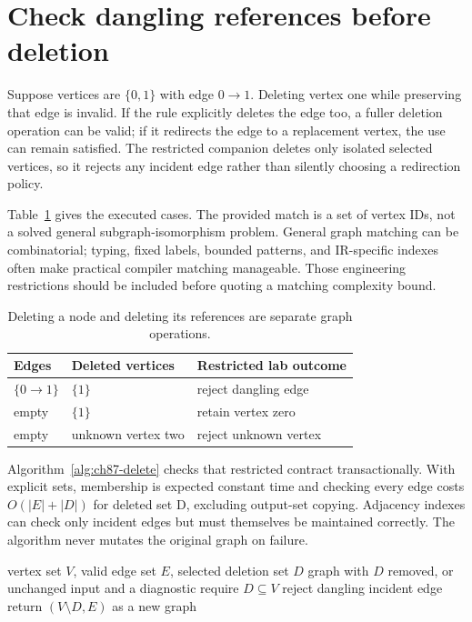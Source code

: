 \section{Check dangling references before deletion}
\label{sec:ch87-dangling}
Suppose vertices are $\{0,1\}$ with edge $0\to1$.
Deleting vertex one while preserving that edge is invalid.
If the rule explicitly deletes the edge too, a fuller deletion operation can be valid; if it redirects the edge to a replacement vertex, the use can remain satisfied.
The restricted companion deletes only isolated selected vertices, so it rejects any incident edge rather than silently choosing a redirection policy.

Table~\ref{tab:ch87-dangling} gives the executed cases.
The provided match is a set of vertex IDs, not a solved general subgraph-isomorphism problem.
General graph matching can be combinatorial; typing, fixed labels, bounded patterns, and IR-specific indexes often make practical compiler matching manageable.
Those engineering restrictions should be included before quoting a matching complexity bound.

\begin{table}[htbp]
\caption{Deleting a node and deleting its references are separate graph operations.}
\label{tab:ch87-dangling}
\centering
\begin{tabular}{lll}
\toprule
Edges & Deleted vertices & Restricted lab outcome \\
\midrule
$\{0\to1\}$ & $\{1\}$ & reject dangling edge \\
empty & $\{1\}$ & retain vertex zero \\
empty & unknown vertex two & reject unknown vertex \\
\bottomrule
\end{tabular}
\end{table}

Algorithm~\ref{alg:ch87-delete} checks that restricted contract transactionally.
With explicit sets, membership is expected constant time and checking every edge costs $O(|E|+|D|)$ for deleted set D, excluding output-set copying.
Adjacency indexes can check only incident edges but must themselves be maintained correctly.
The algorithm never mutates the original graph on failure.

\begin{algorithm}[htbp]
\caption{Delete supplied isolated vertices without inventing an edge-removal policy.}
\label{alg:ch87-delete}
\begin{pseudocode}
\Require vertex set $V$, valid edge set $E$, selected deletion set $D$
\Ensure graph with $D$ removed, or unchanged input and a diagnostic
\State require $D\subseteq V$
 \State reject dangling incident edge \EndIf
\EndFor
\State return $(V\setminus D,E)$ as a new graph
\end{pseudocode}
\end{algorithm}

